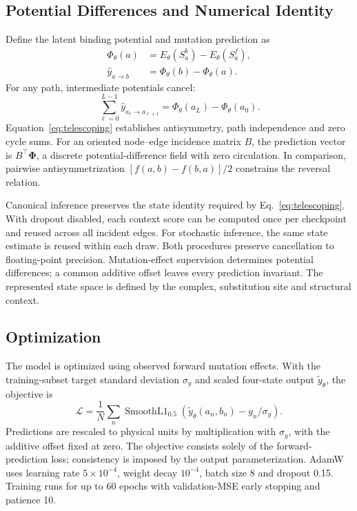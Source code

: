 \subsection{Potential Differences and Numerical Identity}
Define the latent binding potential and mutation prediction as
\begin{align}
 \Phi_\theta(a)&=E_\theta(S_a^b)-E_\theta(S_a^f),\\
 \widehat y_{a\to b}&=\Phi_\theta(b)-\Phi_\theta(a).
 \label{eq:potential}
\end{align}
For any path, intermediate potentials cancel:
\begin{equation}
 \sum_{\ell=0}^{L-1}\widehat y_{a_\ell\to a_{\ell+1}}
 =\Phi_\theta(a_L)-\Phi_\theta(a_0).
 \label{eq:telescoping}
\end{equation}
Equation~\eqref{eq:telescoping} establishes antisymmetry, path independence
and zero cycle sums. For an oriented node--edge incidence matrix $B$, the
prediction vector is $B^\top\boldsymbol\Phi$, a discrete potential-difference
field with zero circulation. In comparison, pairwise antisymmetrization
$[f(a,b)-f(b,a)]/2$ constrains the reversal relation.

Canonical inference preserves the state identity required by
Eq.~\eqref{eq:telescoping}. With dropout disabled, each context score can be
computed once per checkpoint and reused across all incident edges.
For stochastic inference, the same state estimate is reused within each
draw. Both procedures preserve cancellation to floating-point precision.
Mutation-effect supervision determines potential differences; a common
additive offset leaves every prediction invariant. The represented state
space is defined by the complex, substitution site and structural context.

\subsection{Optimization}
The model is optimized using observed forward mutation effects. With the
training-subset target standard deviation
$\sigma_y$ and scaled four-state output $\widetilde y_\theta$, the objective is
\begin{equation}
 \mathcal L=\frac{1}{N}\sum_n\operatorname{SmoothL1}_{0.5}
 (\widetilde y_\theta(a_n,b_n)-y_n/\sigma_y).
\end{equation}
Predictions are rescaled to physical units by multiplication with
$\sigma_y$, with the additive offset fixed at zero. The objective consists
solely of the forward-prediction loss; consistency is imposed by the output
parameterization. AdamW uses learning rate $5\times10^{-4}$,
weight decay $10^{-4}$, batch size 8 and dropout 0.15. Training runs for up to
60 epochs with validation-MSE early stopping and patience 10.
